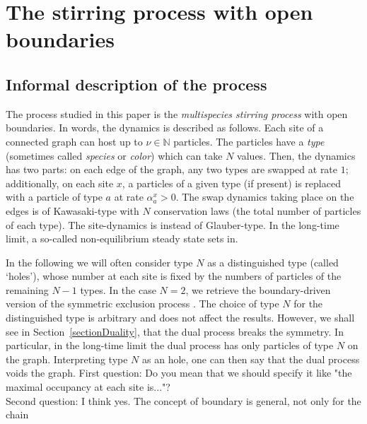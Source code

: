 \documentclass[10pt]{article}
\numberwithin{equation}{section}
\numberwithin{equation}{subsection}
\newtheorem{remark}{Remark}
\begin{document}
\section{The stirring process with open boundaries}
\label{sec1}
\subsection{Informal description of the process}
The process studied in this paper is the {\em multispecies stirring process}
with open boundaries. 
In words, the dynamics is described as follows. Each site
of a connected graph can host up to $\nu\in \mathbb{N}$ particles.
The particles have a {\em type} (sometimes called {\em species} or {\em color})
which can take $N$ values.
Then, the dynamics has two parts: on each edge of the graph, 
any two types are swapped at rate $1$; additionally, on each site $x$, 
a particles of a given type (if present) is replaced with a
particle of type $a$ at rate $\alpha_a^x >0$.
The swap dynamics taking place on the edges is of Kawasaki-type 
with $N$ conservation laws
(the total number of particles of each type). 
The site-dynamics is instead of Glauber-type. 
In the long-time limit, a so-called non-equilibrium
steady state sets in.


In the following we will often consider type $N$ as a distinguished type
(called `holes'), whose number at each site is fixed by the numbers of particles 
of the remaining $N-1$ types. 
In the case $N=2$, we retrieve the  boundary-driven version of the symmetric exclusion process \cite{schutzSandow,carinci2013duality}.
The choice of type $N$ for the distinguished type is arbitrary and does not affect
the results. However, we shall see in Section~\ref{sectionDuality}, that
the dual process breaks the symmetry.
In particular, in the  long-time limit the dual process has only particles of type $N$ on the graph.
Interpreting type $N$ as an hole, one can then say that the dual process voids the graph.   
{\color{blue} First question: Do you mean that we should specify it like "the maximal occupancy at each site is..."?\\
Second question: I think yes. The concept of boundary is general, not only for the chain}
\end{document}
